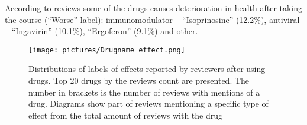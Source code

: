 \documentclass[a4paper,fleqn,longmktitle]{cas-dc}
\begin{document}
According to reviews some of the drugs causes deterioration in health after taking the course (``Worse'' label): immunomodulator -- ``Isoprinosine'' (12.2\%), antiviral -- ``Ingavirin'' (10.1\%), ``Ergoferon'' (9.1\%) and other.
\begin{figure*}
    \centering
    \texttt{[image: pictures/Drugname\_effect.png]}
    \caption{Distributions of labels of effects reported by reviewers after using drugs. Top 20 drugs by the reviews count are presented. The number in brackets is the number of reviews with mentions of a drug. Diagrams show part of reviews mentioning a specific type of effect from the total amount of reviews with the drug}
    \label{fig:effects}
\end{figure*}

\end{document}
